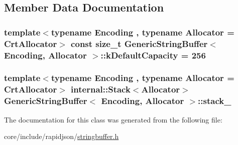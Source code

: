 \subsection{Member Data Documentation}
\subsubsection[{\texorpdfstring{k\+Default\+Capacity}{kDefaultCapacity}}]{\setlength{\rightskip}{0pt plus 5cm}template$<$typename Encoding , typename Allocator  = Crt\+Allocator$>$ const size\+\_\+t {\bf Generic\+String\+Buffer}$<$ Encoding, Allocator $>$\+::k\+Default\+Capacity = 256\hspace{0.3cm}{\ttfamily [static]}}\hypertarget{classGenericStringBuffer_ae74f9df854dd5a7db4315ef44b016d22}{}\label{classGenericStringBuffer_ae74f9df854dd5a7db4315ef44b016d22}
\subsubsection[{\texorpdfstring{stack\+\_\+}{stack_}}]{\setlength{\rightskip}{0pt plus 5cm}template$<$typename Encoding , typename Allocator  = Crt\+Allocator$>$ {\bf internal\+::\+Stack}$<$Allocator$>$ {\bf Generic\+String\+Buffer}$<$ Encoding, Allocator $>$\+::stack\+\_\+\hspace{0.3cm}{\ttfamily [mutable]}}\hypertarget{classGenericStringBuffer_aaef716643febb9de5957dbf8ff904409}{}\label{classGenericStringBuffer_aaef716643febb9de5957dbf8ff904409}


The documentation for this class was generated from the following file\+:\begin{DoxyCompactItemize}
\item 
core/include/rapidjson/\hyperlink{stringbuffer_8h}{stringbuffer.\+h}\end{DoxyCompactItemize}
